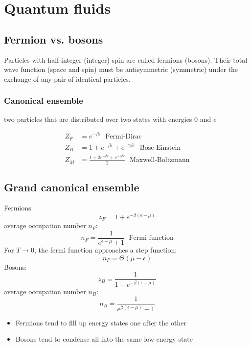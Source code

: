 \section{Quantum fluids}

\subsection*{Fermion vs. bosons}
Particles with half-integer (integer) spin are called fermions (bosons). Their
total wave function (space and spin) must be antisymmetric (symmetric)
under the exchange of any pair of identical particles.

\subsubsection*{Canonical ensemble}
two particles that are distributed over two states with energies 0 and $\epsilon$

\begin{equation*}
    \begin{aligned}
        Z_F &= e^{-\beta \epsilon} \; \text{ Fermi-Dirac} \\
        Z_B &= 1+ e^{-\beta \epsilon} + e^{-2\beta \epsilon} \; \text{ Bose-Einstein} \\
        Z_M &= \frac{1+ 2e^{-\beta \epsilon} + e^{-2\beta \epsilon}}{2} \; \text{ Maxwell-Boltzmann}
    \end{aligned}
\end{equation*}

\subsection*{Grand canonical ensemble}
Fermions:
\begin{equation*}
    z_F = 1+e^{-\beta(\epsilon-\mu)}
\end{equation*}
average occupation number $n_F$:
\begin{equation*}
    n_F = \frac{1}{e^{\epsilon - \mu}+1} \; \text{ Fermi function}
\end{equation*}
For $T \rightarrow 0$, the fermi function approaches a step function:
\begin{equation*}
    n_F = \Theta (\mu - \epsilon)
\end{equation*}
Bosons:
\begin{equation*}
    z_B = \frac{1}{1-e^{-\beta(\epsilon-\mu)}}
\end{equation*}
average occupation number $n_B$:
\begin{equation*}
    n_B = \frac{1}{e^{\beta(\epsilon - \mu)}-1}
\end{equation*}

\begin{itemize}
    \item Fermions tend to fill up energy states one after the other
    \item Bosons tend to condense all into the same low energy state
\end{itemize}